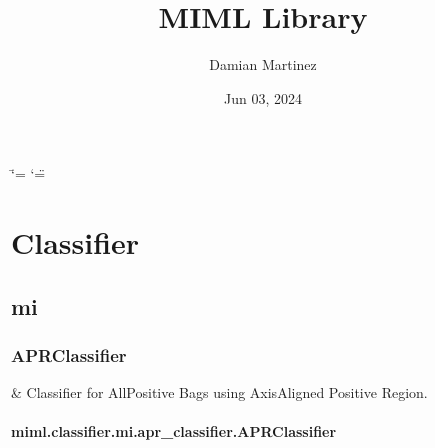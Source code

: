\documentclass[letterpaper,10pt,english]{sphinxmanual}
\title{MIML Library}
\date{Jun 03, 2024}
\author{Damian Martinez}
\begin{document}
\ifdefined\shorthandoff
  \ifnum\catcode`\=\string=\active\shorthandoff{=}\fi
  \ifnum\catcode`\"=\active{}\fi
\fi

\pagestyle{empty}
\sphinxmaketitle
\pagestyle{plain}
\sphinxtableofcontents
\pagestyle{normal}
\label{\detokenize{miml::doc}}


\sphinxstepscope


\chapter{Classifier}
\label{\detokenize{classifier/index:classifier}}\label{\detokenize{classifier/index::doc}}
\sphinxstepscope


\section{mi}
\label{\detokenize{classifier/mi/index:mi}}\label{\detokenize{classifier/mi/index::doc}}
\sphinxstepscope


\subsection{APRClassifier}
\label{\detokenize{classifier/mi/apr_classifier:aprclassifier}}\label{\detokenize{classifier/mi/apr_classifier::doc}}

\begin{savenotes}\sphinxattablestart
\sphinxthistablewithglobalstyle
\sphinxthistablewithnovlinesstyle
\centering
\begin{tabulary}{\linewidth}[t]{}
\sphinxtoprule
\sphinxtableatstartofbodyhook
\sphinxAtStartPar
{\hyperref[\detokenize{classifier/mi/_autosummary/miml.classifier.mi.apr_classifier.APRClassifier:miml.classifier.mi.apr_classifier.APRClassifier}]{}}
&
\sphinxAtStartPar
Classifier for All\sphinxhyphen{}Positive Bags using Axis\sphinxhyphen{}Aligned Positive Region.
\\
\sphinxbottomrule
\end{tabulary}
\sphinxtableafterendhook\par
\sphinxattableend\end{savenotes}

\sphinxstepscope


\subsubsection{miml.classifier.mi.apr\_classifier.APRClassifier}
\label{\detokenize{classifier/mi/_autosummary/miml.classifier.mi.apr_classifier.APRClassifier:miml-classifier-mi-apr-classifier-aprclassifier}}\label{\detokenize{classifier/mi/_autosummary/miml.classifier.mi.apr_classifier.APRClassifier::doc}}
\end{document}
